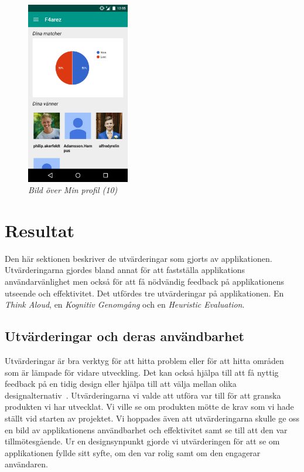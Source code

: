 \documentclass[a4paper, 11pt]{article}
\begin{document}
\begin{figure}[H]
	\begin{center}
	\includegraphics[width=0.4\textwidth]{app_profile} 
	\end{center}
	\caption{\textit{Bild över Min profil (10)}}
\end{figure}


\section{Resultat}
Den här sektionen beskriver de utvärderingar som gjorts av applikationen. Utvärderingarna gjordes bland annat för att fastställa applikations användarvänlighet men också för att få nödvändig feedback på applikationens utseende och effektivitet. Det utfördes tre utvärderingar på applikationen. En \textit{Think Aloud}, en \textit{Kognitiv Genomgång} och en \textit{Heuristic Evaluation}. 

\subsection{Utvärderingar och deras användbarhet}
Utvärderingar är bra verktyg för att hitta problem eller för att hitta områden som är lämpade för vidare utveckling. Det kan också hjälpa till att få nyttig feedback på en tidig design eller hjälpa till att välja mellan olika designalternativ~\cite[sid 226--228]{benyon2010designing}. Utvärderingarna vi valde att utföra var till för att granska produkten vi har utvecklat. Vi ville se om produkten mötte de krav som vi hade ställt vid starten av projektet. Vi hoppades även att utvärderingarna skulle ge oss en bild av applikationens användbarhet och effektivitet samt se till att den var tillmötesgående. Ur en designsynpunkt gjorde vi utvärderingen för att se om applikationen fyllde sitt syfte, om den var rolig samt om den engagerar användaren.
\end{document}
